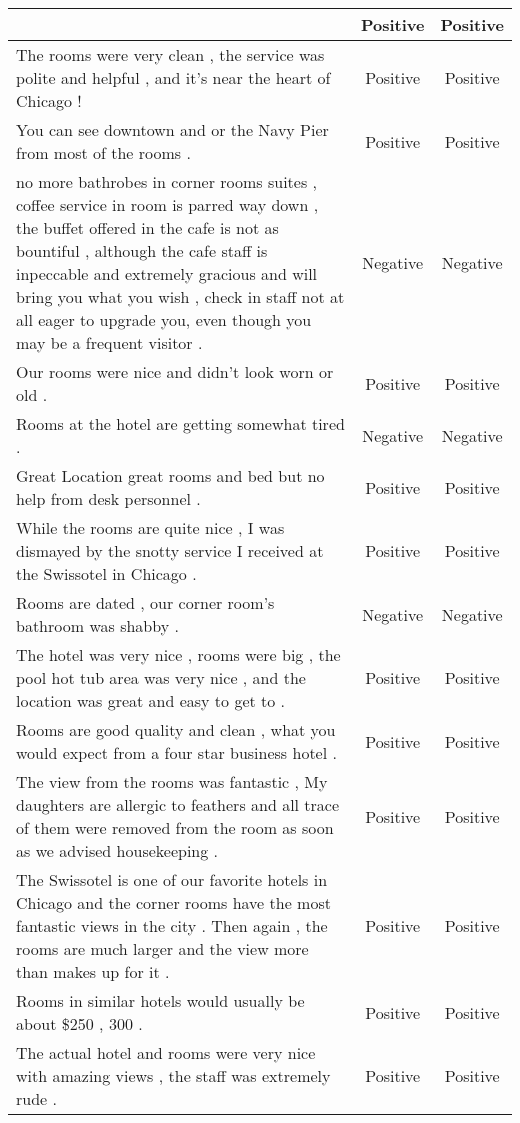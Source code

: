 \begin{table}[f]
\begin{center}
\begin{tabular}{m{8cm}cc}
& Positive & Positive \\ \hline
The rooms were very clean , the service was polite and helpful , and it's near the heart of Chicago !
& Positive & Positive \\ \hline
You can see downtown and or the Navy Pier from most of the rooms .
& Positive & Positive \\ \hline
no more bathrobes in corner rooms suites , coffee service in room is parred way down , the buffet offered in the cafe is not as bountiful , although the cafe staff is inpeccable and extremely gracious and will bring you what you wish , check in staff not at all eager to upgrade you, even though you may be a frequent visitor .
& Negative & Negative \\ \hline
Our rooms were nice and didn't look worn or old .
& Positive & Positive \\ \hline
Rooms at the hotel are getting somewhat tired .
& Negative & Negative \\ \hline
Great Location great rooms and bed but no help from desk personnel .
& Positive & Positive \\ \hline
While the rooms are quite nice , I was dismayed by the snotty service I received at the Swissotel in Chicago .
& Positive & Positive \\ \hline
Rooms are dated , our corner room's bathroom was shabby .
& Negative & Negative \\ \hline
The hotel was very nice , rooms were big , the pool hot tub area was very nice , and the location was great and easy to get to .
& Positive & Positive \\ \hline
Rooms are good quality and clean , what you would expect from a four star business hotel .
& Positive & Positive \\ \hline
The view from the rooms was fantastic , My daughters are allergic to feathers and all trace of them were removed from the room as soon as we advised housekeeping .
& Positive & Positive \\ \hline
The Swissotel is one of our favorite hotels in Chicago and the corner rooms have the most fantastic views in the city .
Then again , the rooms are much larger and the view more than makes up for it .
& Positive & Positive \\ \hline
Rooms in similar hotels would usually be about \$250 , 300 .
& Positive & Positive \\ \hline
The actual hotel and rooms were very nice with amazing views , the staff was extremely rude .
& Positive & Positive \\ \hline

\end{tabular}
\end{center}
\end{table}

